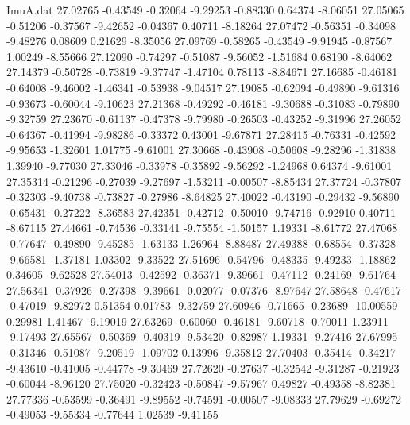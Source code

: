 \begin{filecontents}{ImuA.dat}
  27.02765   -0.43549   -0.32064   -9.29253   -0.88330    0.64374   -8.06051
  27.05065   -0.51206   -0.37567   -9.42652   -0.04367    0.40711   -8.18264
  27.07472   -0.56351   -0.34098   -9.48276    0.08609    0.21629   -8.35056
  27.09769   -0.58265   -0.43549   -9.91945   -0.87567    1.00249   -8.55666
  27.12090   -0.74297   -0.51087   -9.56052   -1.51684    0.68190   -8.64062
  27.14379   -0.50728   -0.73819   -9.37747   -1.47104    0.78113   -8.84671
  27.16685   -0.46181   -0.64008   -9.46002   -1.46341   -0.53938   -9.04517
  27.19085   -0.62094   -0.49890   -9.61316   -0.93673   -0.60044   -9.10623
  27.21368   -0.49292   -0.46181   -9.30688   -0.31083   -0.79890   -9.32759
  27.23670   -0.61137   -0.47378   -9.79980   -0.26503   -0.43252   -9.31996
  27.26052   -0.64367   -0.41994   -9.98286   -0.33372    0.43001   -9.67871
  27.28415   -0.76331   -0.42592   -9.95653   -1.32601    1.01775   -9.61001
  27.30668   -0.43908   -0.50608   -9.28296   -1.31838    1.39940   -9.77030
  27.33046   -0.33978   -0.35892   -9.56292   -1.24968    0.64374   -9.61001
  27.35314   -0.21296   -0.27039   -9.27697   -1.53211   -0.00507   -8.85434
  27.37724   -0.37807   -0.32303   -9.40738   -0.73827   -0.27986   -8.64825
  27.40022   -0.43190   -0.29432   -9.56890   -0.65431   -0.27222   -8.36583
  27.42351   -0.42712   -0.50010   -9.74716   -0.92910    0.40711   -8.67115
  27.44661   -0.74536   -0.33141   -9.75554   -1.50157    1.19331   -8.61772
  27.47068   -0.77647   -0.49890   -9.45285   -1.63133    1.26964   -8.88487
  27.49388   -0.68554   -0.37328   -9.66581   -1.37181    1.03302   -9.33522
  27.51696   -0.54796   -0.48335   -9.49233   -1.18862    0.34605   -9.62528
  27.54013   -0.42592   -0.36371   -9.39661   -0.47112   -0.24169   -9.61764
  27.56341   -0.37926   -0.27398   -9.39661   -0.02077   -0.07376   -8.97647
  27.58648   -0.47617   -0.47019   -9.82972    0.51354    0.01783   -9.32759
  27.60946   -0.71665   -0.23689  -10.00559    0.29981    1.41467   -9.19019
  27.63269   -0.60060   -0.46181   -9.60718   -0.70011    1.23911   -9.17493
  27.65567   -0.50369   -0.40319   -9.53420   -0.82987    1.19331   -9.27416
  27.67995   -0.31346   -0.51087   -9.20519   -1.09702    0.13996   -9.35812
  27.70403   -0.35414   -0.34217   -9.43610   -0.41005   -0.44778   -9.30469
  27.72620   -0.27637   -0.32542   -9.31287   -0.21923   -0.60044   -8.96120
  27.75020   -0.32423   -0.50847   -9.57967    0.49827   -0.49358   -8.82381
  27.77336   -0.53599   -0.36491   -9.89552   -0.74591   -0.00507   -9.08333
  27.79629   -0.69272   -0.49053   -9.55334   -0.77644    1.02539   -9.41155

\end{filecontents}
